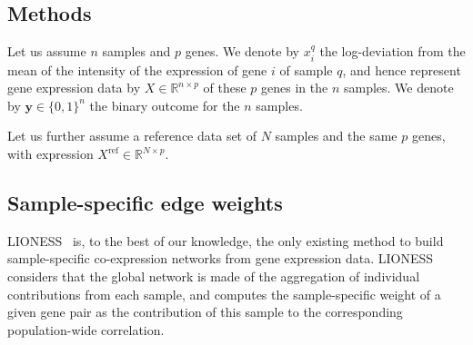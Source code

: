 \documentclass{bioinfo}
\newcommand{\xmat}{X}
\newcommand{\yy}{\bm{y}}
\newcommand{\xxref}{X^{\mbox{ref}}}
\begin{document}
\begin{methods}
\section{Methods}
Let us assume $n$ samples and $p$ genes. We denote by $x_{i}^q$ the log-deviation from the mean of the intensity of the expression of gene $i$ of sample $q$, and hence represent gene expression data by  $\xmat \in \mathbb{R}^{n \times p}$ of these $p$ genes in the $n$ samples. We denote by $\yy \in \{0, 1\}^n$ the binary outcome for the $n$ samples.

Let us further assume a reference data set of $N$ samples and the same $p$ genes, with expression $\xxref \in \mathbb{R}^{N \times p}$.






\subsection{Sample-specific edge weights}

LIONESS~\citep{kuijjer2015} is, to the best of our knowledge, the only existing method to build sample-specific co-expression networks from gene expression data.
LIONESS considers that the global network is made of the aggregation of individual contributions from each sample,
and computes the sample-specific weight of a given gene pair as the contribution of this sample to the corresponding population-wide correlation. 





\end{methods}
\end{document}
